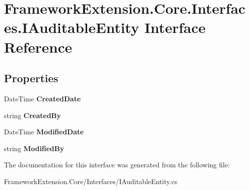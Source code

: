 \hypertarget{interface_framework_extension_1_1_core_1_1_interfaces_1_1_i_auditable_entity}{\section{Framework\-Extension.\-Core.\-Interfaces.\-I\-Auditable\-Entity Interface Reference}
\label{interface_framework_extension_1_1_core_1_1_interfaces_1_1_i_auditable_entity}
}
\subsection*{Properties}
\begin{DoxyCompactItemize}
\item 
\hypertarget{interface_framework_extension_1_1_core_1_1_interfaces_1_1_i_auditable_entity_aad7433e3f83ee4717646b934ac99e39f}{Date\-Time {\bfseries Created\-Date}}\label{interface_framework_extension_1_1_core_1_1_interfaces_1_1_i_auditable_entity_aad7433e3f83ee4717646b934ac99e39f}

\item 
\hypertarget{interface_framework_extension_1_1_core_1_1_interfaces_1_1_i_auditable_entity_a6377d54897523ff616b9575b04fad762}{string {\bfseries Created\-By}}\label{interface_framework_extension_1_1_core_1_1_interfaces_1_1_i_auditable_entity_a6377d54897523ff616b9575b04fad762}

\item 
\hypertarget{interface_framework_extension_1_1_core_1_1_interfaces_1_1_i_auditable_entity_ab615ce49f19a49dd7d6643df0a25baa0}{Date\-Time {\bfseries Modified\-Date}}\label{interface_framework_extension_1_1_core_1_1_interfaces_1_1_i_auditable_entity_ab615ce49f19a49dd7d6643df0a25baa0}

\item 
\hypertarget{interface_framework_extension_1_1_core_1_1_interfaces_1_1_i_auditable_entity_a70ba9dabc0c90989a09b8d319ec18888}{string {\bfseries Modified\-By}}\label{interface_framework_extension_1_1_core_1_1_interfaces_1_1_i_auditable_entity_a70ba9dabc0c90989a09b8d319ec18888}

\end{DoxyCompactItemize}


The documentation for this interface was generated from the following file\-:\begin{DoxyCompactItemize}
\item 
Framework\-Extension.\-Core/\-Interfaces/I\-Auditable\-Entity.\-cs\end{DoxyCompactItemize}
